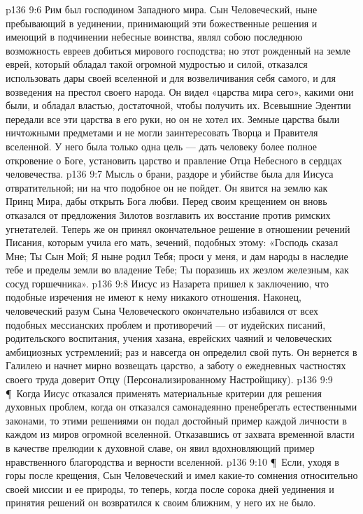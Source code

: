 \vs p136 9:6 Рим был господином Западного мира. Сын Человеческий, ныне пребывающий в уединении, принимающий эти божественные решения и имеющий в подчинении небесные воинства, являл собою последнюю возможность евреев добиться мирового господства; но этот рожденный на земле еврей, который обладал такой огромной мудростью и силой, отказался использовать дары своей вселенной и для возвеличивания себя самого, и для возведения на престол своего народа. Он видел «царства мира сего», какими они были, и обладал властью, достаточной, чтобы получить их. Всевышние Эдентии передали все эти царства в его руки, но он не хотел их. Земные царства были ничтожными предметами и не могли заинтересовать Творца и Правителя вселенной. У него была только одна цель --- дать человеку более полное откровение о Боге, установить царство и правление Отца Небесного в сердцах человечества.
\vs p136 9:7 Мысль о брани, раздоре и убийстве была для Иисуса отвратительной; ни на что подобное он не пойдет. Он явится на землю как Принц Мира, дабы открыть Бога любви. Перед своим крещением он вновь отказался от предложения Зилотов возглавить их восстание против римских угнетателей. Теперь же он принял окончательное решение в отношении речений Писания, которым учила его мать, зечений, подобных этому: «Господь сказал Мне; Ты Сын Мой; Я ныне родил Тебя; проси у меня, и дам народы в наследие тебе и пределы земли во владение Тебе; Ты поразишь их жезлом железным, как сосуд горшечника».
\vs p136 9:8 Иисус из Назарета пришел к заключению, что подобные изречения не имеют к нему никакого отношения. Наконец, человеческий разум Сына Человеческого окончательно избавился от всех подобных мессианских проблем и противоречий --- от иудейских писаний, родительского воспитания, учения хазана, еврейских чаяний и человеческих амбициозных устремлений; раз и навсегда он определил свой путь. Он вернется в Галилею и начнет мирно возвещать царство, а заботу о ежедневных частностях своего труда доверит Отцу (Персонализированному Настройщику).
\vs p136 9:9 \P\ Когда Иисус отказался применять материальные критерии для решения духовных проблем, когда он отказался самонадеянно пренебрегать естественными законами, то этими решениями он подал достойный пример каждой личности в каждом из миров огромной вселенной. Отказавшись от захвата временной власти в качестве прелюдии к духовной славе, он явил вдохновляющий пример нравственного благородства и верности вселенной.
\vs p136 9:10 \P\ Если, уходя в горы после крещения, Сын Человеческий и имел какие\hyp{}то сомнения относительно своей миссии и ее природы, то теперь, когда после сорока дней уединения и принятия решений он возвратился к своим ближним, у него их не было.
